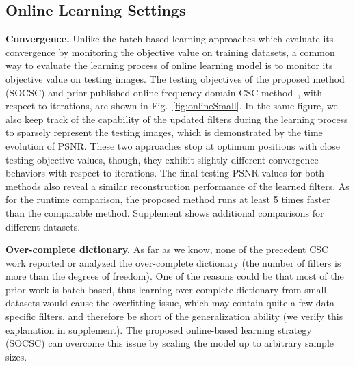\subsection{Online Learning Settings}

{\bfseries Convergence.} Unlike the batch-based learning approaches which evaluate its convergence by monitoring the objective value on training datasets, a common way to evaluate the learning process of online learning model is to monitor its objective value on testing images. The testing objectives of the proposed method (SOCSC) and prior published online frequency-domain CSC method~\cite{liu-2018-first}, with respect to iterations, are shown in Fig.\ \ref{fig:onlineSmall}. In the same figure, we also keep track of the capability of the updated filters during the learning process to sparsely represent the testing images, which is demonstrated by the time evolution of PSNR. These two approaches stop at optimum positions with close testing objective values, though, they exhibit slightly different convergence behaviors with respect to iterations. The final testing PSNR values for both methods also reveal a similar reconstruction performance of the learned filters. As for the runtime comparison, the proposed method runs at least 5 times faster than the comparable method. Supplement shows additional comparisons for different datasets.


{\bfseries Over-complete dictionary.} As far as we know, none of the precedent CSC work reported or analyzed the over-complete dictionary (the number of filters is more than the degrees of freedom). One of the reasons could be that most of the prior work is batch-based, thus learning over-complete dictionary from small datasets would cause the overfitting issue, which may contain quite a few data-specific filters, and therefore be short of the generalization ability (we verify this explanation in supplement). The proposed online-based learning strategy (SOCSC) can overcome this issue by scaling the model up to arbitrary sample sizes.

